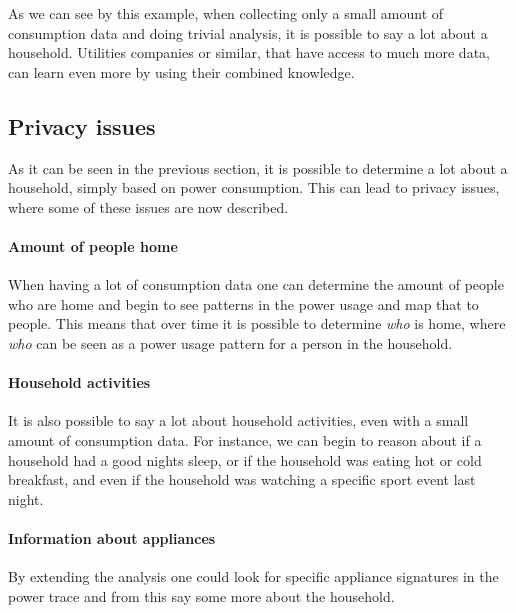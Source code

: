 As we can see by this example, when collecting only a small amount of consumption data and doing trivial analysis, it is possible to say a lot about a household.
Utilities companies or similar, that have access to much more data, can learn even more by using their combined knowledge.

\subsection{Privacy issues}\label{privacy_concerns}
As it can be seen in the previous section, it is possible to determine a lot about a household, simply based on power consumption.
This can lead to privacy issues, where some of these issues are now described.

\paragraph{Amount of people home}
When having a lot of consumption data one can determine the amount of people who are home and begin to see patterns in the power usage and map that to people.
This means that over time it is possible to determine \textit{who} is home, where \textit{who} can be seen as a power usage pattern for a person in the household.

\paragraph{Household activities}
  
It is also possible to say a lot about household activities, even with a small amount of consumption data.
For instance, we can begin to reason about if a household had a good nights sleep, or if the household was eating hot or cold breakfast, and even if the household was watching a specific sport event last night.
\paragraph{Information about appliances}
By extending the analysis one could look for specific appliance signatures in the power trace and from this say some more about the household.



